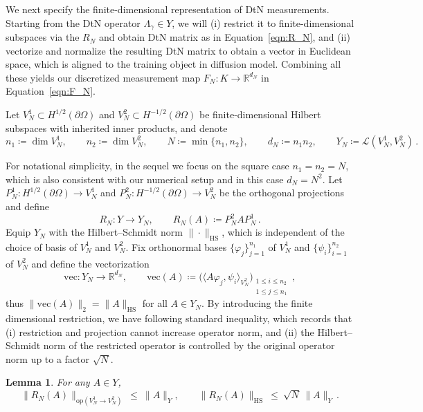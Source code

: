 \documentclass{article}
\def\Eqref#1{Equation~\ref{#1}}
\def\1{\bm{1}}
\newcommand{\R}{\mathbb{R}}
\newtheorem{lemma}[theorem]{Lemma}
\begin{document}
We next specify the finite-dimensional representation of DtN measurements. Starting from the DtN operator $\Lambda_\gamma\in Y$, we will (i) restrict it to finite-dimensional subspaces via the $R_N$ and obtain DtN matrix as in \Eqref{eqn:R_N}, 
and (ii) vectorize and normalize the resulting DtN matrix to obtain a vector in Euclidean space, which is aligned to the training object in diffusion model. 
Combining all these yields our discretized measurement map $F_N:K\to\R^{d_N}$ in \Eqref{eqn:F_N}. 

Let $V_N^1\subset H^{1/2}(\partial\Omega)$ and $V_N^2\subset H^{-1/2}(\partial\Omega)$ be finite-dimensional Hilbert subspaces with inherited inner products, and denote
\[
n_1\coloneqq \dim V_N^1,\qquad n_2\coloneqq \dim V_N^2,\qquad N\coloneqq \min\{n_1,n_2\},\qquad d_N\coloneqq n_1n_2,\qquad Y_N\coloneqq \mathcal{L}(V_N^1,V_N^2)\,.
\]

For notational simplicity, in the sequel we focus on the square case $n_1=n_2=N$, which is also consistent with our numerical setup and in this case $d_N=N^2$.
Let $P_N^1:H^{1/2}(\partial\Omega)\to V_N^1$ and $P_N^2:H^{-1/2}(\partial\Omega)\to V_N^2$
be the orthogonal projections and define 
\begin{equation}\label{eqn:R_N}
R_N:Y\to Y_N,\qquad R_N(A)\coloneqq P_N^2AP_N^1\,.
\end{equation}
Equip $Y_N$ with the Hilbert--Schmidt norm $\|\cdot\|_{\mathrm{HS}}$, which is independent of the choice of basis of $V_N^1$ and $V_N^2$.
Fix orthonormal bases $\{\varphi_j\}_{j=1}^{n_1}$ of $V_N^1$ and $\{\psi_i\}_{i=1}^{n_2}$ of $V_N^2$ and define the vectorization
\[
\mathrm{vec}:Y_N\to\R^{d_N},\qquad
\mathrm{vec}(A)\coloneqq \Big(\langle A\varphi_j,\psi_i\rangle_{V_N^2}\Big)_{\substack{1\le i\le n_2\\1\le j\le n_1}}\,,
\]
thus $\|\mathrm{vec}(A)\|_2=\|A\|_{\mathrm{HS}}$ for all $A\in Y_N$. By introducing the finite dimensional restriction, we have following standard inequality, which records that (i) restriction and projection cannot increase operator norm, and (ii) the Hilbert–Schmidt norm of the restricted operator is controlled by the original operator norm up to a factor $\sqrt{N}$. 
\begin{lemma}\label{lem:RN-stable}
For any $A\in Y$,
\[
\|R_N(A)\|_{\mathrm{op}(V_N^1\to V_N^2)}\ \le\ \|A\|_Y,
\qquad
\|R_N(A)\|_{\mathrm{HS}}\ \le\ \sqrt{N}\,\|A\|_Y\,.
\]
\end{lemma}
\end{document}
